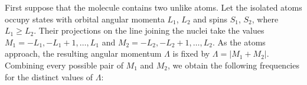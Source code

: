 First suppose that the molecule contains two unlike atoms.
Let the isolated atoms occupy states with orbital angular momenta $L_1$, $L_2$ and spins $S_1$, $S_2$, where $L_1\geqslant L_2$.
Their projections on the line joining the nuclei take the values $M_1=-L_1,-L_1+1,\ldots,L_1$ and $M_2=-L_2,-L_2+1,\ldots,L_2$.
As the atoms approach, the resulting angular momentum $\Lambda$ is fixed by $\Lambda=|M_1+M_2|$.
Combining every possible pair of $M_1$ and $M_2$, we obtain the following frequencies for the distinct values of $\Lambda$:

